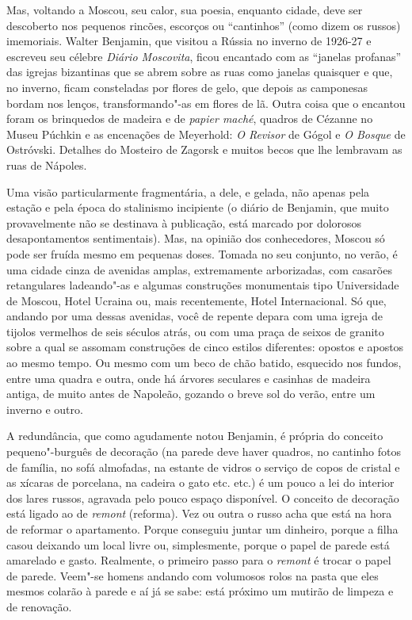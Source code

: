 Mas, voltando a Moscou, seu calor, sua poesia, enquanto cidade, deve ser
descoberto nos pequenos rincões, escorços ou ``cantinhos'' (como dizem
os russos) imemoriais. Walter Benjamin, que visitou a Rússia no inverno
de 1926-27 e escreveu seu célebre \emph{Diário Moscovita}, ficou
encantado com as ``janelas profanas'' das igrejas bizantinas que se
abrem sobre as ruas como janelas quaisquer e que, no inverno, ficam
consteladas por flores de gelo, que depois as camponesas bordam nos
lenços, transformando"-as em flores de lã. Outra coisa que o encantou
foram os brinquedos de madeira e de \emph{papier maché}, quadros de
Cézanne no Museu Púchkin e as encenações de Meyerhold: \emph{O Revisor}
de Gógol e \emph{O Bosque} de Ostróvski. Detalhes do Mosteiro de Zagorsk
e muitos becos que lhe lembravam as ruas de Nápoles.

Uma visão particularmente fragmentária, a dele, e gelada, não apenas
pela estação e pela época do stalinismo incipiente (o diário de
Benjamin, que muito provavelmente não se destinava à publicação, está
marcado por dolorosos desapontamentos sentimentais). Mas, na opinião dos
conhecedores, Moscou só pode ser fruída mesmo em pequenas doses. Tomada
no seu conjunto, no verão, é uma cidade cinza de avenidas amplas,
extremamente arborizadas, com casarões retangulares ladeando"-as e
algumas construções monumentais tipo Universidade de Moscou, Hotel
Ucraina ou, mais recentemente, Hotel Internacional. Só que, andando por
uma dessas avenidas, você de repente depara com uma igreja de tijolos
vermelhos de seis séculos atrás, ou com uma praça de seixos de granito
sobre a qual se assomam construções de cinco estilos diferentes: opostos
e apostos ao mesmo tempo. Ou mesmo com um beco de chão batido, esquecido
nos fundos, entre uma quadra e outra, onde há árvores seculares e
casinhas de madeira antiga, de muito antes de Napoleão, gozando o breve
sol do verão, entre um inverno e outro.

A redundância, que como agudamente notou Benjamin, é própria do conceito
pequeno"-burguês de decoração (na parede deve haver quadros, no cantinho
fotos de família, no sofá almofadas, na estante de vidros o serviço de
copos de cristal e as xícaras de porcelana, na cadeira o gato etc. etc.)
é um pouco a lei do interior dos lares russos, agravada pelo pouco
espaço disponível. O conceito de decoração está ligado ao de
\emph{remont} (reforma). Vez ou outra o russo acha que está na hora de
reformar o apartamento. Porque conseguiu juntar um dinheiro, porque a
filha casou deixando um local livre ou, simplesmente, porque o papel de
parede está amarelado e gasto. Realmente, o primeiro passo para o
\emph{remont} é trocar o papel de parede. Veem"-se homens andando com
volumosos rolos na pasta que eles mesmos colarão à parede e aí já se
sabe: está próximo um mutirão de limpeza e de renovação.

